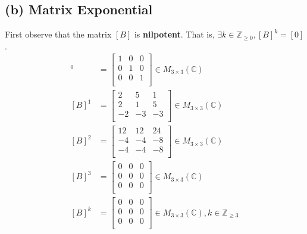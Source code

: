\documentclass[12pt, letterpaper]{article}
\newcommand{\Z}{\mathbb{Z}}
\newcommand{\C}{\mathbb{C}}
\begin{document}
\subsection*{(b) \textmd{Matrix Exponential}}

First observe that the matrix $[B]$ is \textbf{nilpotent}. That is, $\exists k \in \Z_{\ge0}, [B]^k = [0]$.
\begin{align*}
[B]^0 &= \begin{bmatrix}
1 & 0 & 0 \\
0 & 1 & 0 \\
0 & 0 & 1 \\
\end{bmatrix} \in M_{3\times3}(\C) \\
[B]^1 &= \begin{bmatrix}
2 & 5 & 1 \\
2 & 1 & 5 \\
-2 & -3 & -3 \\
\end{bmatrix} \in M_{3\times3}(\C) \\
[B]^2 &= \begin{bmatrix}
12 & 12 & 24 \\
-4 & -4 & -8 \\
-4 & -4 & -8 \\
\end{bmatrix} \in M_{3\times3}(\C) \\
[B]^3 &= \begin{bmatrix}
0 & 0 & 0 \\
0 & 0 & 0 \\
0 & 0 & 0 \\
\end{bmatrix} \in M_{3\times3}(\C) \\
[B]^k &= \begin{bmatrix}
0 & 0 & 0 \\
0 & 0 & 0 \\
0 & 0 & 0 \\
\end{bmatrix} \in M_{3\times3}(\C), k \in \Z_{\ge 3}
\end{align*}
\end{document}
